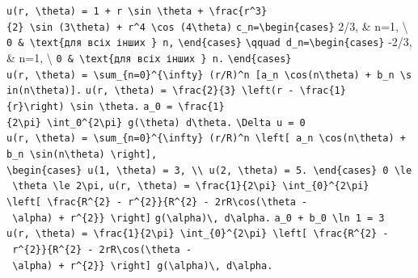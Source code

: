 \documentclass[
  ukrainian,
]{article}
\begin{document}
\texttt{u(r,\ \textbackslash{}theta)\ =\ 1\ +\ r\ \textbackslash{}sin\ \textbackslash{}theta\ +\ \textbackslash{}frac\{r\^{}3\}\{2\}\ \textbackslash{}sin\ (3\textbackslash{}theta)\ +\ r\^{}4\ \textbackslash{}cos\ (4\textbackslash{}theta)}
\texttt{c\_n=\textbackslash{}begin\{cases\}} 2/3, \& n=1,
\textbackslash{}
\texttt{0\ \&\ \textbackslash{}text\{для\ всіх\ інших\ \}\ n,}
\texttt{\textbackslash{}end\{cases\}}
\texttt{\textbackslash{}qquad\ d\_n=\textbackslash{}begin\{cases\}}
-2/3, \& n=1, \textbackslash{}
\texttt{0\ \&\ \textbackslash{}text\{для\ всіх\ інших\ \}\ n.}
\texttt{\textbackslash{}end\{cases\}}
\texttt{u(r,\ \textbackslash{}theta)\ =\ \textbackslash{}sum\_\{n=0\}\^{}\{\textbackslash{}infty\}\ (r/R)\^{}n\ {[}a\_n\ \textbackslash{}cos(n\textbackslash{}theta)\ +\ b\_n\ \textbackslash{}sin(n\textbackslash{}theta){]}.}
\texttt{u(r,\ \textbackslash{}theta)\ =\ \textbackslash{}frac\{2\}\{3\}\ \textbackslash{}left(r\ -\ \textbackslash{}frac\{1\}\{r\}\textbackslash{}right)\ \textbackslash{}sin\ \textbackslash{}theta.}
\texttt{a\_0\ =\ \textbackslash{}frac\{1\}\{2\textbackslash{}pi\}\ \textbackslash{}int\_0\^{}\{2\textbackslash{}pi\}\ g(\textbackslash{}theta)\ d\textbackslash{}theta.}
\texttt{\textbackslash{}Delta\ u\ =\ 0}
\texttt{u(r,\ \textbackslash{}theta)\ =\ \textbackslash{}sum\_\{n=0\}\^{}\{\textbackslash{}infty\}\ (r/R)\^{}n\ \textbackslash{}left{[}\ a\_n\ \textbackslash{}cos(n\textbackslash{}theta)\ +\ b\_n\ \textbackslash{}sin(n\textbackslash{}theta)\ \textbackslash{}right{]},}
\texttt{\textbackslash{}begin\{cases\}\ u(1,\ \textbackslash{}theta)\ =\ 3,\ \textbackslash{}\textbackslash{}\ u(2,\ \textbackslash{}theta)\ =\ 5.\ \textbackslash{}end\{cases\}\ 0\ \textbackslash{}le\ \textbackslash{}theta\ \textbackslash{}le\ 2\textbackslash{}pi,}
\texttt{u(r,\ \textbackslash{}theta)\ =\ \textbackslash{}frac\{1\}\{2\textbackslash{}pi\}\ \textbackslash{}int\_\{0\}\^{}\{2\textbackslash{}pi\}}
\texttt{\textbackslash{}left{[}\ \textbackslash{}frac\{R\^{}\{2\}\ -\ r\^{}\{2\}\}\{R\^{}\{2\}\ -\ 2rR\textbackslash{}cos(\textbackslash{}theta\ -\ \textbackslash{}alpha)\ +\ r\^{}\{2\}\}\ \textbackslash{}right{]}}
\texttt{g(\textbackslash{}alpha)\textbackslash{},\ d\textbackslash{}alpha.}
\texttt{a\_0\ +\ b\_0\ \textbackslash{}ln\ 1\ =\ 3}
\texttt{u(r,\ \textbackslash{}theta)\ =\ \textbackslash{}frac\{1\}\{2\textbackslash{}pi\}\ \textbackslash{}int\_\{0\}\^{}\{2\textbackslash{}pi\}\ \textbackslash{}left{[}\ \textbackslash{}frac\{R\^{}\{2\}\ -\ r\^{}\{2\}\}\{R\^{}\{2\}\ -\ 2rR\textbackslash{}cos(\textbackslash{}theta\ -\ \textbackslash{}alpha)\ +\ r\^{}\{2\}\}\ \textbackslash{}right{]}\ g(\textbackslash{}alpha)\textbackslash{},\ d\textbackslash{}alpha.}
\end{document}
